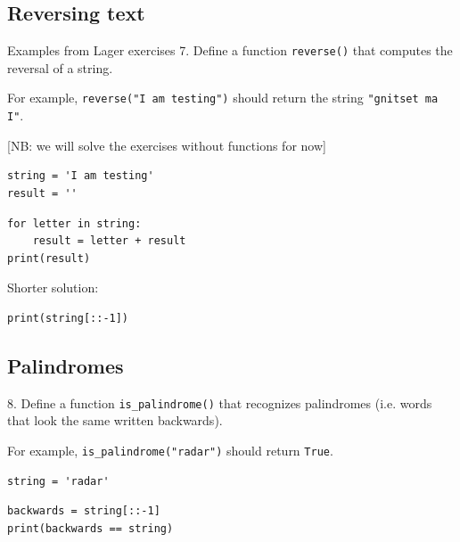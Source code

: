 \documentclass[aspectratio=169,usenames,dvipsnames]{beamer}
\begin{document}
\subsection{Reversing text}
\begin{frame}[fragile]{Examples from Lager exercises}
7. Define a function \texttt{reverse()} that computes the reversal of a string.

   \vspace{1em}
   For example, \texttt{reverse("I am testing")} should return the string
   \texttt{"gnitset ma I"}.

[NB: we will solve the exercises without functions for now]

\begin{lstlisting}
string = 'I am testing'
result = ''
\end{lstlisting}
\pause
\begin{lstlisting}
for letter in string:
    result = letter + result
print(result)
\end{lstlisting}

\pause
Shorter solution:
\begin{lstlisting}
print(string[::-1])
\end{lstlisting}
\end{frame}

\subsection{Palindromes}
\begin{frame}[fragile]
8. Define a function \texttt{is\_palindrome()} that recognizes palindromes
   (i.e. words that look the same written backwards).

   \vspace{1em}
   For example, \texttt{is\_palindrome("radar")} should return \texttt{True}.

\begin{lstlisting}
string = 'radar'
\end{lstlisting}
\pause
\begin{lstlisting}
backwards = string[::-1]
print(backwards == string)
\end{lstlisting}
\end{frame}
 
\end{document}
